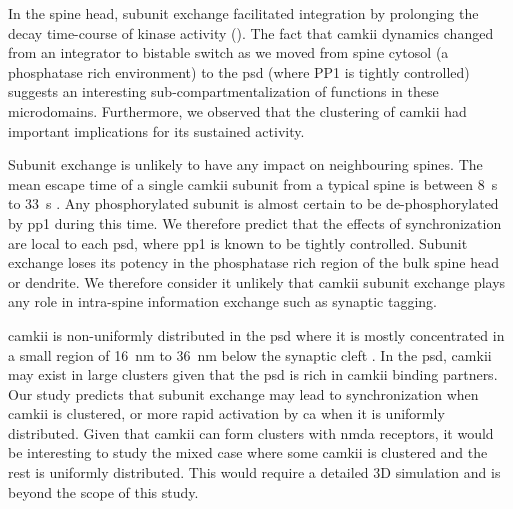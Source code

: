 \documentclass[9pt,lineno,doublespacing]{elife}
\begin{document}
In the spine head, subunit exchange facilitated integration by prolonging the
decay time-course of kinase activity (). The fact that
\gls{camkii} dynamics changed from an integrator to bistable switch as we moved
from spine cytosol (a phosphatase rich environment) to the \gls{psd} (where PP1
is tightly controlled) suggests an interesting sub-compartmentalization of
functions in these microdomains. Furthermore, we observed that the clustering of
\gls{camkii} had important implications for its sustained activity.

Subunit exchange is unlikely to have any impact on neighbouring spines. The mean
escape time of a single \gls{camkii} subunit from a typical spine is between
\SI{8}{\second} to \SI{33}{\second} \citep{holcman_diffusion_2011}. Any
phosphorylated subunit is almost certain to be de-phosphorylated by \gls{pp1}
during this time. We therefore predict that the effects of synchronization are
local to each \gls{psd}, where \gls{pp1} is known to be tightly controlled.
Subunit exchange loses its potency in the phosphatase rich region of the bulk
spine head or dendrite. We therefore consider it unlikely that \gls{camkii}
subunit exchange plays any role in intra-spine information exchange such as
synaptic tagging.

\Gls{camkii} is non-uniformly distributed in the \gls{psd} where it is mostly
concentrated in a small region of \SI{16}{\nano \meter} to \SI{36}{\nano \meter}
below the synaptic cleft \citep{petersen_distribution_2003}. In the \gls{psd},
\gls{camkii} may exist in large clusters given that the \gls{psd} is rich in
\gls{camkii} binding partners. Our study predicts that subunit exchange may
lead to synchronization when \gls{camkii} is clustered, or more rapid activation
by \gls{ca} when it is uniformly distributed. Given that \gls{camkii} can form
clusters with \gls{nmda} receptors, it would be interesting to study the mixed
case where some \gls{camkii} is clustered and the rest is uniformly distributed.
This would require a detailed 3D simulation and is beyond the scope of this 
study.
\end{document}
